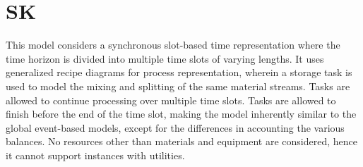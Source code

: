 \section{SK}
This model \citep{Karimi} considers a synchronous slot-based time representation where the time horizon is divided into multiple time slots of varying lengths. It uses generalized recipe diagrams for process representation, wherein a storage task is used to model the mixing and splitting of the same material streams. Tasks are allowed to continue processing over multiple time slots. Tasks are allowed to finish before the end of the time slot, making the model inherently similar to the global event-based models, except for the differences in accounting the various balances. No resources other than materials and equipment are considered, hence it cannot support instances with utilities.


